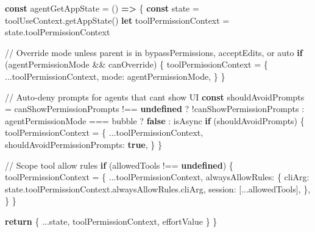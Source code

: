 \documentclass[
  english,
  11pt,
  letterpaper,
]{book}
\newenvironment{Shaded}{\begin{snugshade}}{\end{snugshade}}
\newcommand{\AttributeTok}[1]{\textcolor[rgb]{0.40,0.45,0.13}{#1}}
\newcommand{\CommentTok}[1]{\textcolor[rgb]{0.37,0.37,0.37}{#1}}
\newcommand{\ControlFlowTok}[1]{\textcolor[rgb]{0.00,0.23,0.31}{\textbf{#1}}}
\newcommand{\FunctionTok}[1]{\textcolor[rgb]{0.28,0.35,0.67}{#1}}
\newcommand{\KeywordTok}[1]{\textcolor[rgb]{0.00,0.23,0.31}{\textbf{#1}}}
\newcommand{\NormalTok}[1]{\textcolor[rgb]{0.00,0.23,0.31}{#1}}
\newcommand{\OperatorTok}[1]{\textcolor[rgb]{0.37,0.37,0.37}{#1}}
\newcommand{\StringTok}[1]{\textcolor[rgb]{0.13,0.47,0.30}{#1}}
\begin{document}
\begin{Shaded}
\begin{Highlighting}[]
\KeywordTok{const}\NormalTok{ agentGetAppState }\OperatorTok{=}\NormalTok{ () }\KeywordTok{=\textgreater{}}\NormalTok{ \{}
  \KeywordTok{const}\NormalTok{ state }\OperatorTok{=}\NormalTok{ toolUseContext}\OperatorTok{.}\FunctionTok{getAppState}\NormalTok{()}
  \KeywordTok{let}\NormalTok{ toolPermissionContext }\OperatorTok{=}\NormalTok{ state}\OperatorTok{.}\AttributeTok{toolPermissionContext}

  \CommentTok{// Override mode unless parent is in bypassPermissions, acceptEdits, or auto}
  \ControlFlowTok{if}\NormalTok{ (agentPermissionMode }\OperatorTok{\&\&}\NormalTok{ canOverride) \{}
\NormalTok{    toolPermissionContext }\OperatorTok{=}\NormalTok{ \{}
      \OperatorTok{...}\NormalTok{toolPermissionContext}\OperatorTok{,}
\NormalTok{      mode}\OperatorTok{:}\NormalTok{ agentPermissionMode}\OperatorTok{,}
\NormalTok{    \}}
\NormalTok{  \}}

  \CommentTok{// Auto{-}deny prompts for agents that can\textquotesingle{}t show UI}
  \KeywordTok{const}\NormalTok{ shouldAvoidPrompts }\OperatorTok{=}
\NormalTok{    canShowPermissionPrompts }\OperatorTok{!==} \KeywordTok{undefined}
      \OperatorTok{?} \OperatorTok{!}\NormalTok{canShowPermissionPrompts}
      \OperatorTok{:}\NormalTok{ agentPermissionMode }\OperatorTok{===} \StringTok{\textquotesingle{}bubble\textquotesingle{}}
        \OperatorTok{?} \KeywordTok{false}
        \OperatorTok{:}\NormalTok{ isAsync}
  \ControlFlowTok{if}\NormalTok{ (shouldAvoidPrompts) \{}
\NormalTok{    toolPermissionContext }\OperatorTok{=}\NormalTok{ \{}
      \OperatorTok{...}\NormalTok{toolPermissionContext}\OperatorTok{,}
\NormalTok{      shouldAvoidPermissionPrompts}\OperatorTok{:} \KeywordTok{true}\OperatorTok{,}
\NormalTok{    \}}
\NormalTok{  \}}

  \CommentTok{// Scope tool allow rules}
  \ControlFlowTok{if}\NormalTok{ (allowedTools }\OperatorTok{!==} \KeywordTok{undefined}\NormalTok{) \{}
\NormalTok{    toolPermissionContext }\OperatorTok{=}\NormalTok{ \{}
      \OperatorTok{...}\NormalTok{toolPermissionContext}\OperatorTok{,}
\NormalTok{      alwaysAllowRules}\OperatorTok{:}\NormalTok{ \{}
\NormalTok{        cliArg}\OperatorTok{:}\NormalTok{ state}\OperatorTok{.}\AttributeTok{toolPermissionContext}\OperatorTok{.}\AttributeTok{alwaysAllowRules}\OperatorTok{.}\AttributeTok{cliArg}\OperatorTok{,}
\NormalTok{        session}\OperatorTok{:}\NormalTok{ [}\OperatorTok{...}\NormalTok{allowedTools]}\OperatorTok{,}
\NormalTok{      \}}\OperatorTok{,}
\NormalTok{    \}}
\NormalTok{  \}}

  \ControlFlowTok{return}\NormalTok{ \{ }\OperatorTok{...}\NormalTok{state}\OperatorTok{,}\NormalTok{ toolPermissionContext}\OperatorTok{,}\NormalTok{ effortValue \}}
\NormalTok{\}}
\end{Highlighting}
\end{Shaded}
\end{document}

